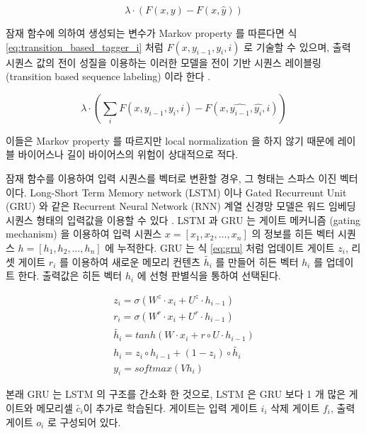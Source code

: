 \documentclass[11pt]{article}
\begin{document}
\begin{equation}
  \label{eq:max_margine_tagger}
  \lambda \cdot \left( F(x, y) - F(x, \hat{y}) \right)
\end{equation}

잠재 함수에 의하여 생성되는 변수가 Markov property 를 따른다면 식 \ref{eq:transition_based_tagger_i} 처럼 $F(x, y_{i-1}, y_{i}, i)$ 로 기술할 수 있으며, 출력 시퀀스 값의 전이 성질을 이용하는 이러한 모델을 전이 기반 시퀀스 레이블링 (transition based sequence labeling) 이라 한다 \citep{bohnet2012transition}.

\begin{equation}
  \label{eq:transition_based_tagger_i}
  \lambda \cdot \left( \sum_i F(x, y_{i-1}, y_i, i) - F(x, \hat{y_{i-1}}, \hat{y_i}, i) \right)
\end{equation}

이들은 Markov property 를 따르지만 local normalization 을 하지 않기 때문에 레이블 바이어스나 길이 바이어스의 위험이 상대적으로 적다.

잠재 함수를 이용하여 입력 시퀀스를 벡터로 변환할 경우, 그 형태는 스파스 이진 벡터이다.
Long-Short Term Memory network (LSTM) 이나 Gated Recurreunt Unit (GRU) 와 같은 Recurrent Neural Network (RNN) 계열 신경망 모델은 워드 임베딩 시퀀스 형태의 입력값을 이용할 수 있다 \citep{cho2014learning, hochreiter1997long}.
LSTM 과 GRU 는 게이트 메커니즘 (gating mechanism) 을 이용하여 입력 시퀀스 $x = [x_1, x_2, \dots, x_n]$ 의 정보를 히든 벡터 시퀀스 $h = [h_1, h_2, \dots, h_n]$ 에 누적한다.
GRU 는 식 \ref{eq:gru} 처럼 업데이트 게이트 $z_i$, 리셋 게이트 $r_i$ 를 이용하여 새로운 메모리 컨텐츠 $\tilde{h_i}$ 를 만들어 히든 벡터 $h_i$ 를 업데이트 한다.
출력값은 히든 벡터 $h_i$ 에 선형 판별식을 통하여 선택된다.

\begin{equation}
  \label{eq:gru}
  \begin{aligned}
  z_i = \sigma(W^z \cdot x_i + U^z \cdot h_{i-1}) \\
  r_i = \sigma(W^r \cdot x_i + U^r \cdot h_{i-1}) \\
  \tilde{h_i} = tanh \left( W \cdot x_i + r \circ U \cdot h_{i-1}\right) \\
  h_i = z_i \circ h_{i-1} + (1 - z_i) \circ \tilde{h_i} \\
  y_i = softmax(Vh_i)
  \end{aligned}
\end{equation}

본래 GRU 는 LSTM 의 구조를 간소화 한 것으로, LSTM 은 GRU 보다 1 개 많은 게이트와 메모리셀 $\tilde{c_i}$이 추가로 학습된다.
게이트는 입력 게이트 $i_i$ 삭제 게이트 $f_i$, 출력 게이트 $o_i$ 로 구성되어 있다.
\end{document}
